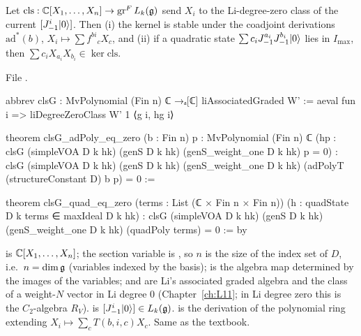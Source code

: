 \begin{proposition}\label{l23:prop:clsG}
Let $\mathrm{cls}:{\mathbb{C}}[X_1,\dots,X_n]\to\operatorname{gr}^F L_k(\mathfrak g)$ send $X_i$ to the Li-degree-zero class of the current
$[J^i_{-1}|0\rangle]$. Then (i) the kernel is stable under the coadjoint derivations $\mathrm{ad}^*(b)$, $X_i\mapsto\sum f^{bi}{}_cX_c$,
and (ii) if a quadratic state $\sum c_iJ^{a_i}_{-1}J^{b_i}_{-1}|0\rangle$ lies in $I_{\max}$, then
$\sum c_iX_{a_i}X_{b_i}\in\ker\mathrm{cls}$.
\end{proposition}
\noindent File .
\begin{leancode}
abbrev clsG : MvPolynomial (Fin n) ℂ →ₐ[ℂ] liAssociatedGraded W' :=
  aeval fun i => liDegreeZeroClass W' 1 ⟨g i, hg i⟩

theorem clsG_adPoly_eq_zero (b : Fin n) {p : MvPolynomial (Fin n) ℂ}
    (hp : clsG (simpleVOA D k hk) (genS D k hk) (genS_weight_one D k hk) p = 0) :
    clsG (simpleVOA D k hk) (genS D k hk) (genS_weight_one D k hk)
      (adPolyT (structureConstant D) b p) = 0 :=

theorem clsG_quad_eq_zero (terms : List (ℂ × Fin n × Fin n)) (h : quadState D k terms ∈ maxIdeal D k hk) :
    clsG (simpleVOA D k hk) (genS D k hk) (genS_weight_one D k hk) (quadPoly terms) = 0 := by
\end{leancode}

\begin{dictionary}
 is ${\mathbb{C}}[X_1,\dots,X_n]$; the section variable is , so $n$ is the size of the
index set of $D$, i.e.\ $n=\dim\mathfrak g$ (variables indexed by the basis);  is the algebra map determined by the images of the variables;
 and  are Li's associated graded algebra and the class of a weight-$N$ vector in
Li degree $0$ (Chapter~\ref{ch:L11}; in Li degree zero this is the $C_2$-algebra $R_V$).  is $[J^i_{-1}|0\rangle]\in L_k(\mathfrak g)$.
 is the derivation of the polynomial ring extending $X_i\mapsto\sum_cT(b,i,c)X_c$. Same as the textbook.
\end{dictionary}

